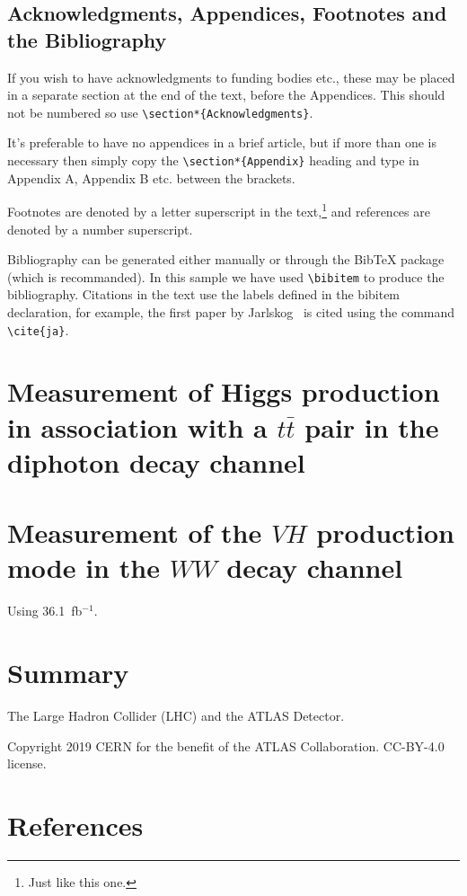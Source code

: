\documentclass{moriond}
\begin{document}
\subsection{Acknowledgments, Appendices, Footnotes and the Bibliography}

If you wish to have
acknowledgments to funding bodies etc., these may be placed in a separate
section at the end of the text, before the Appendices. This should not
be numbered so use \verb^\section*{Acknowledgments}^.

It's preferable to have no appendices in a brief article, but if more
than one is necessary then simply copy the
\verb^\section*{Appendix}^
heading and type in Appendix A, Appendix B etc. between the brackets.

Footnotes are denoted by a letter superscript
in the text,\footnote{Just like this one.} and references
are denoted by a number superscript.

Bibliography can be generated either manually or through the BibTeX
package (which is recommanded). In this sample we
have used \verb^\bibitem^ to produce the bibliography.
Citations in the text use the labels defined in the bibitem declaration,
for example, the first paper by Jarlskog~ is cited using the command
\verb^\cite{ja}^.

\section{Measurement of Higgs production in association with a $t\bar t$ pair in the diphoton decay channel}\label{subsec:final}



\section{Measurement of the $VH$ production mode in the $WW$ decay channel} \label{sec:vh_ww}

Using 36.1~fb$^{-1}$.

\section*{Summary}

The Large Hadron Collider (LHC) \cite{Evans:2008zzb} and the ATLAS Detector.

Copyright 2019 CERN for the benefit of the ATLAS Collaboration. CC-BY-4.0 license.

\section*{References}


\end{document}
